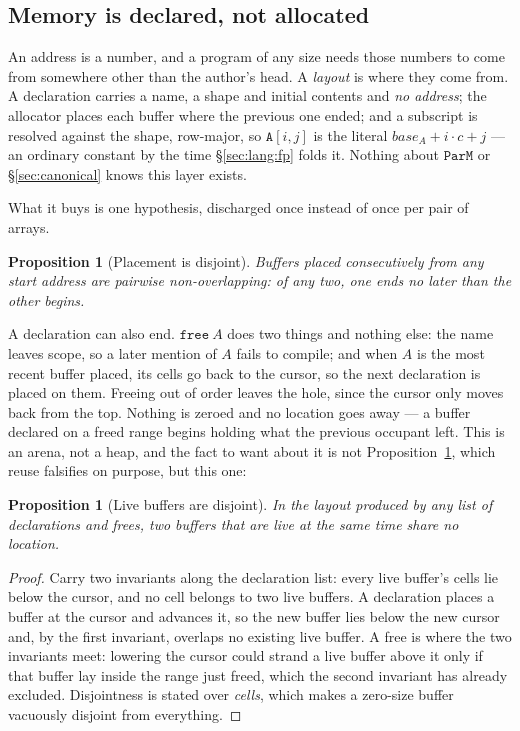 \documentclass[11pt,a4paper]{article}
\theoremstyle{definition}
\theoremstyle{plain}
\newtheorem{proposition}[definition]{Proposition}
\theoremstyle{remark}
\newcommand{\PM}{\texttt{ParM}}
\begin{document}
\subsection{Memory is declared, not allocated}\label{sec:lang:mem}

An address is a number, and a program of any size needs those numbers to come from somewhere
other than the author's head. A \emph{layout} is where they come from. A declaration carries
a name, a shape and initial contents and \emph{no address}; the allocator places each buffer
where the previous one ended; and a subscript is resolved against the shape, row-major, so
$\mathtt{A}[i,j]$ is the literal $\mathit{base}_A + i\cdot c + j$ --- an ordinary constant by
the time \S\ref{sec:lang:fp} folds it. Nothing about $\PM$ or \S\ref{sec:canonical} knows
this layer exists.

What it buys is one hypothesis, discharged once instead of once per pair of arrays.

\begin{proposition}[Placement is disjoint]\label{prop:alloc}
Buffers placed consecutively from any start address are pairwise non-overlapping: of any two,
one ends no later than the other begins.
\end{proposition}

A declaration can also end. $\mathtt{free}\ A$ does two things and nothing else: the name
leaves scope, so a later mention of $A$ fails to compile; and when $A$ is the most recent
buffer placed, its cells go back to the cursor, so the next declaration is placed on them.
Freeing out of order leaves the hole, since the cursor only moves back from the top. Nothing
is zeroed and no location goes away --- a buffer declared on a freed range begins holding
what the previous occupant left. This is an arena, not a heap, and the fact to want about it
is not Proposition~\ref{prop:alloc}, which reuse falsifies on purpose, but this one:

\begin{proposition}[Live buffers are disjoint]\label{prop:arena}
In the layout produced by any list of declarations and frees, two buffers that are live at
the same time share no location.
\end{proposition}

\begin{proof}
Carry two invariants along the declaration list: every live buffer's cells lie below the
cursor, and no cell belongs to two live buffers. A declaration places a buffer at the cursor
and advances it, so the new buffer lies below the new cursor and, by the first invariant,
overlaps no existing live buffer. A free is where the two invariants meet: lowering the
cursor could strand a live buffer above it only if that buffer lay inside the range just
freed, which the second invariant has already excluded. Disjointness is stated over
\emph{cells}, which makes a zero-size buffer vacuously disjoint from everything.
\end{proof}
\end{document}
